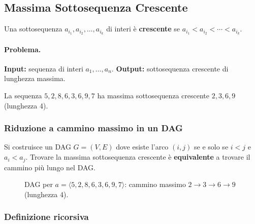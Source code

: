 \subsection{Massima Sottosequenza Crescente}

\begin{definizione}
Una sottosequenza $a_{i_1}, a_{i_2}, \ldots, a_{i_k}$ di interi è
\textbf{crescente} se $a_{i_1} < a_{i_2} < \cdots < a_{i_k}$.
\end{definizione}

\paragraph{Problema.}
\textbf{Input:} sequenza di interi $a_1, \ldots, a_n$.
\textbf{Output:} sottosequenza crescente di lunghezza massima.

\begin{esempio}[MSC]
La sequenza $5, 2, 8, 6, 3, 6, 9, 7$ ha massima sottosequenza crescente
$2, 3, 6, 9$ (lunghezza 4).
\end{esempio}

\subsubsection{Riduzione a cammino massimo in un DAG}

Si costruisce un DAG $G = (V, E)$ dove esiste l'arco $(i, j)$ se e solo se
$i < j$ e $a_i < a_j$. Trovare la massima sottosequenza crescente è
\textbf{equivalente} a trovare il cammino più lungo nel DAG.

\begin{figure}[H]
	\centering
	\caption{DAG per $a=\langle 5,2,8,6,3,6,9,7\rangle$: cammino massimo $2\to 3\to 6\to 9$ (lunghezza 4).}
\end{figure}

\subsubsection{Definizione ricorsiva}

